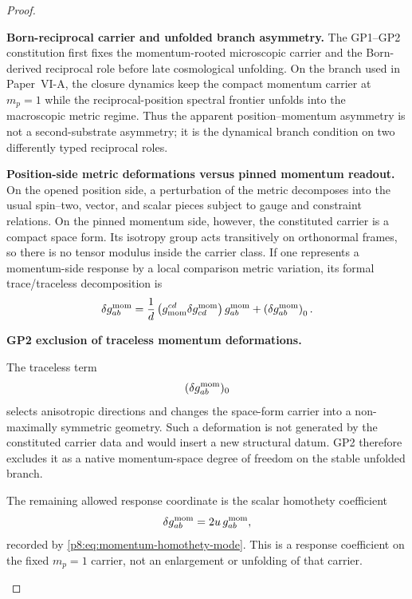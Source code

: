 \documentclass[12pt,a4paper]{article}
\begin{document}
\begin{proof}
\begin{proofsteps}
\item \textbf{Born-reciprocal carrier and unfolded branch asymmetry.}
The GP1--GP2 constitution first fixes the momentum-rooted microscopic carrier
and the Born-derived reciprocal role before late cosmological unfolding.  On
the branch used in Paper~VI-A, the closure dynamics keep the compact momentum
carrier at \(m_p=1\) while the reciprocal-position spectral frontier unfolds into
the macroscopic metric regime.  Thus the apparent position--momentum asymmetry
is not a second-substrate asymmetry; it is the dynamical branch condition on two
differently typed reciprocal roles.

\item \textbf{Position-side metric deformations versus pinned momentum readout.}
On the opened position side, a perturbation of the metric decomposes into the
usual spin--two, vector, and scalar pieces subject to gauge and constraint
relations.  On the pinned momentum side, however, the constituted carrier is a
compact space form.  Its isotropy group acts transitively on orthonormal frames,
so there is no tensor modulus inside the carrier class.  If one represents a
momentum-side response by a local comparison metric variation, its formal
trace/traceless decomposition is
\[
    \delta g^{\rm mom}_{ab}
    =\frac{1}{d}\left(g_{\rm mom}^{cd}\delta g^{\rm mom}_{cd}\right)g^{\rm mom}_{ab}
      +\left(\delta g^{\rm mom}_{ab}\right)_0 .
\]

\item \textbf{GP2 exclusion of traceless momentum deformations.}
\leavevmode\par\noindent
The traceless term
\[
  (\delta g^{\rm mom}_{ab})_0
\]
selects anisotropic directions and changes the space-form carrier into a
non-maximally symmetric geometry.  Such a deformation is not generated by the
constituted carrier data and would insert a new structural datum.  GP2 therefore
excludes it as a native momentum-space degree of freedom on the stable unfolded
branch.

The remaining allowed response coordinate is the scalar homothety coefficient
\[
  \delta g^{\rm mom}_{ab}=2u\,g^{\rm mom}_{ab},
\]
recorded by \eqref{p8:eq:momentum-homothety-mode}.  This is a response
coefficient on the fixed \(m_p=1\) carrier, not an enlargement or unfolding of
that carrier.


\end{proofsteps}
\end{proof}
\end{document}
